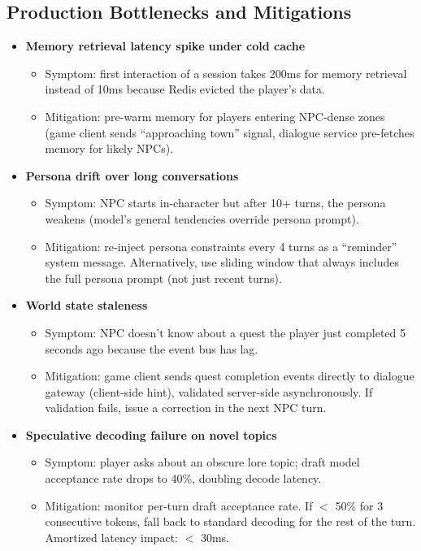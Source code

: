 \subsection*{Production Bottlenecks and Mitigations}
\begin{itemize}
  \item \textbf{Memory retrieval latency spike under cold cache}
  \begin{itemize}
    \item Symptom: first interaction of a session takes 200ms for memory retrieval instead of 10ms because Redis evicted the player's data.
    \item Mitigation: pre-warm memory for players entering NPC-dense zones (game client sends ``approaching town'' signal, dialogue service pre-fetches memory for likely NPCs).
  \end{itemize}

  \item \textbf{Persona drift over long conversations}
  \begin{itemize}
    \item Symptom: NPC starts in-character but after 10+ turns, the persona weakens (model's general tendencies override persona prompt).
    \item Mitigation: re-inject persona constraints every 4 turns as a ``reminder'' system message. Alternatively, use sliding window that always includes the full persona prompt (not just recent turns).
  \end{itemize}

  \item \textbf{World state staleness}
  \begin{itemize}
    \item Symptom: NPC doesn't know about a quest the player just completed 5 seconds ago because the event bus has lag.
    \item Mitigation: game client sends quest completion events directly to dialogue gateway (client-side hint), validated server-side asynchronously. If validation fails, issue a correction in the next NPC turn.
  \end{itemize}

  \item \textbf{Speculative decoding failure on novel topics}
  \begin{itemize}
    \item Symptom: player asks about an obscure lore topic; draft model acceptance rate drops to 40\%, doubling decode latency.
    \item Mitigation: monitor per-turn draft acceptance rate. If $<$ 50\% for 3 consecutive tokens, fall back to standard decoding for the rest of the turn. Amortized latency impact: $<$ 30ms.
  \end{itemize}


\end{itemize}
